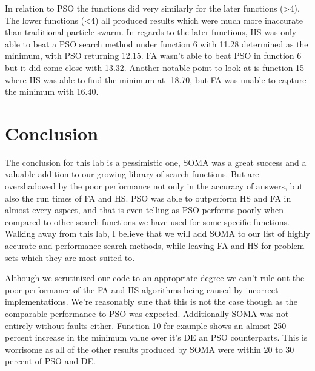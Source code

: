 \documentclass[paper=a4, fontsize=11pt]{scrartcl}
\numberwithin{equation}{section}
\numberwithin{figure}{section}
\numberwithin{table}{section}
\begin{document}
In relation to PSO the functions did very similarly for the later functions (>4). The lower functions (<4)
all produced results which were much more inaccurate than traditional particle swarm. In regards to the
later functions, HS was only able to beat a PSO search method under function 6 with 11.28 determined as
the minimum, with PSO returning 12.15. FA wasn't able to beat PSO in function 6 but it did come close
with 13.32. Another notable point to look at is function 15 where HS was able to find the minimum at
-18.70, but FA was unable to capture the minimum with 16.40.


\section{Conclusion}

The conclusion for this lab is a pessimistic one, SOMA was a great success and a valuable
addition to our growing library of search functions. But are overshadowed by the poor performance
not only in the accuracy of answers, but also the run times of FA and HS. PSO was able to
outperform HS and FA in almost every aspect, and that is even telling as PSO performs
poorly when compared to other search functions we have used for some specific functions.
Walking away from this lab, I believe that we will add SOMA to our list of highly accurate
and performance search methods, while leaving FA and HS for problem sets which they are most
suited to.

Although we scrutinized our code to an appropriate degree we can't rule out the poor performance
of the FA and HS algorithms being caused by incorrect implementations. We're reasonably
sure that this is not the case though as the comparable performance to PSO was expected.
Additionally SOMA was not entirely without faults either. Function 10 for example shows an almost 250
percent increase in the minimum value over it's DE an PSO counterparts. This is worrisome as
all of the other results produced by SOMA were within 20 to 30 percent of PSO and DE.
\end{document}

